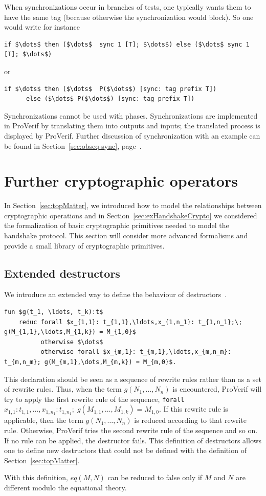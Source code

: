\documentclass{book}
\begin{document}
When synchronizations occur in branches of tests, one typically
wants them to have the same tag (because otherwise the synchronization
would block). So one would write for instance
\begin{lstlisting}[numbers=none]
if $\dots$ then ($\dots$  sync 1 [T]; $\dots$) else ($\dots$ sync 1 [T]; $\dots$)
\end{lstlisting}
or
\begin{lstlisting}[numbers=none]
if $\dots$ then ($\dots$  P($\dots$) [sync: tag prefix T])
      else ($\dots$ P($\dots$) [sync: tag prefix T])
\end{lstlisting}

Synchronizations
cannot be used with phases. Synchronizations are implemented in
ProVerif by translating them into outputs and inputs; the translated
process is displayed by ProVerif. Further discussion of synchronization
with an example can be found in
Section~\ref{sec:obseq-sync}, page~\pageref{sec:obseq-sync}.


\section{Further cryptographic operators}

In Section~\ref{sec:topMatter}, we introduced how to model the relationships between cryptographic operations and in Section~\ref{sec:exHandshakeCrypto} we considered the formalization of basic cryptographic primitives needed to model the handshake protocol. This section will consider more advanced formalisms and provide a small library of cryptographic primitives.

\subsection{Extended destructors}\label{sec:ext_destructors}

We introduce an extended way to define the behaviour of destructors~\cite{ChevalBlanchetPOST13}.
\begin{lstlisting}[numbers=none]
	fun $g(t_1, \ldots, t_k):t$
	reduc forall $x_{1,1}: t_{1,1},\ldots,x_{1,n_1}: t_{1,n_1};\; g(M_{1,1},\ldots,M_{1,k}) = M_{1,0}$
	      otherwise $\dots$
	      otherwise forall $x_{m,1}: t_{m,1},\ldots,x_{m,n_m}: t_{m,n_m}; g(M_{m,1},\dots,M_{m,k}) = M_{m,0}$.
\end{lstlisting}
This declaration should be seen as a sequence of rewrite rules rather than as a set of rewrite rules. Thus, when the term $g(N_1, \ldots, N_n)$ is encountered, ProVerif will try to apply the first rewrite rule of the sequence, \lstinline!forall! $x_{1,1}: t_{1,1},\ldots,x_{1,n_1}: t_{1,n_1};\; g(M_{1,1},\ldots,M_{1,k}) = M_{1,0}$. If this rewrite rule is applicable, then the term $g(N_1, \ldots, N_n)$ is reduced according to that rewrite rule. Otherwise, ProVerif tries the second rewrite rule of the sequence and so on. If no rule can be applied, the destructor fails. This definition of destructors allows one to define new destructors that could not be defined with the definition of Section~\ref{sec:topMatter}.
%

%
With this definition, $eq(M,N)$ can be reduced to false only if $M$ and $N$ are different modulo the equational theory.
\medskip
\end{document}
